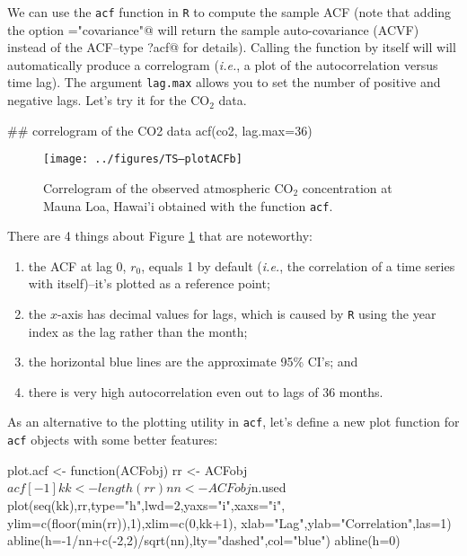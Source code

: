 We can use the \texttt{acf} function in \texttt{R} to compute the sample ACF (note that adding the option \verb@type="covariance"@ will return the sample auto-covariance (ACVF) instead of the ACF--type \verb@?acf@ for details).  Calling the function by itself will will automatically produce a correlogram (\emph{i.e.}, a plot of the autocorrelation versus time lag).  The argument \texttt{lag.max} allows you to set the number of positive and negative lags.  Let's try it for the CO$_2$ data.

\begin{Schunk}
\begin{Sinput}
 ## correlogram of the CO2 data
 acf(co2, lag.max=36)
\end{Sinput}
\end{Schunk}

\begin{figure}[htp]
\begin{center}
\texttt{[image: ../figures/TS--plotACFb]}
\end{center}
\caption{Correlogram of the observed atmospheric CO$_2$ concentration at Mauna Loa, Hawai'i obtained with the function \texttt{acf}.}
\label{fig:LW1.figACF}
\end{figure}

\noindent There are 4 things about Figure \ref{fig:LW1.figACF} that are noteworthy:

\begin{enumerate}
\item the ACF at lag 0, $r_0$, equals 1 by default (\emph{i.e.}, the correlation of a time series with itself)--it's plotted as a reference point;
\item the $x$-axis has decimal values for lags, which is caused by \texttt{R} using the year index as the lag rather than the month;
\item the horizontal blue lines are the approximate 95\% CI's; and
\item there is very high autocorrelation even out to lags of 36 months.
\end{enumerate}                                                                                                              
                                                                                                              As an alternative to the plotting utility in \texttt{acf}, let's define a new plot function for \texttt{acf} objects with some better features:

\begin{Schunk}
\begin{Sinput}
 plot.acf <- function(ACFobj) {
   rr <- ACFobj$acf[-1]
   kk <- length(rr)
   nn <- ACFobj$n.used
   plot(seq(kk),rr,type="h",lwd=2,yaxs="i",xaxs="i",
        ylim=c(floor(min(rr)),1),xlim=c(0,kk+1),
        xlab="Lag",ylab="Correlation",las=1)
   abline(h=-1/nn+c(-2,2)/sqrt(nn),lty="dashed",col="blue")
   abline(h=0)
 }                                                                                                            
\end{Sinput}
\end{Schunk}

